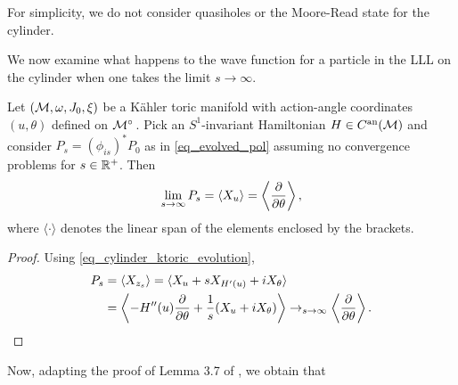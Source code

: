 \documentclass[notas.tex]{subfiles}
\begin{document}
For simplicity, we do not consider quasiholes or the Moore-Read state for the cylinder.

We now examine what happens to the wave function for a particle in the LLL on the cylinder when one takes the limit $s \to \infty$.
\begin{prop}
Let $(\mathcal{M},\omega,J_0,\xi)$ be a Kähler toric manifold with action-angle coordinates $(u,\theta)$ defined on $\mfld^\circ$. Pick an $S^1$-invariant Hamiltonian $H \in C^{\text{an}}(\mathcal{M})$ and consider $P_s = (\phi_{is})^* P_0$ as in \eqref{eq_evolved_pol} assuming no convergence problems for $s \in \mathbb{R}^+$. Then
	\begin{align*}
		\lim_{s \to \infty} P_s =  \langle X_u \rangle = \left \langle \frac{\partial }{\partial \theta} \right \rangle,
	\end{align*}
	where $\langle \cdot \rangle$ denotes the linear span of the elements enclosed by the brackets.
\end{prop}
\begin{proof}
	Using \eqref{eq_cylinder_ktoric_evolution},
	\begin{align*}
		P_s &= \langle X_{z_s} \rangle = \langle X_u + s X_{H'(u)} + i X_\theta \rangle \\
		&= \left \langle - H''(u) \frac{\partial }{\partial \theta} + \frac{1}{s}(X_u + i X_\theta) \right \rangle \to_{s \to \infty} \left \langle \frac{\partial }{\partial \theta} \right \rangle.
	\end{align*}
\end{proof}
Now, adapting the proof of Lemma 3.7 of \cite{baier_toric_2011}, we obtain that 
	
\end{document}
